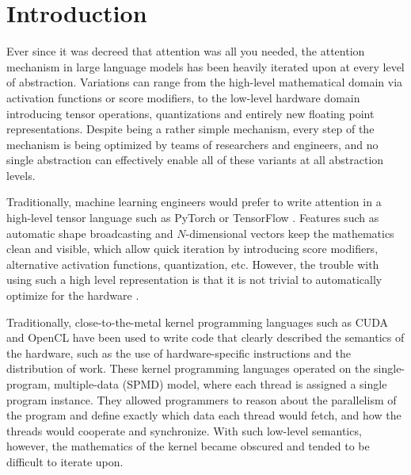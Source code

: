 \documentclass[review, anonymous, acmsmall]{acmart}
\begin{document}

\fi

\maketitle

\section{Introduction}

Ever since it was decreed that attention was all you needed, the attention mechanism in large language models has been heavily iterated upon at every level of abstraction. Variations can range from the high-level mathematical domain via activation functions or score modifiers, to the low-level hardware domain introducing tensor operations, quantizations and entirely new floating point representations. Despite being a rather simple mechanism, every step of the mechanism is being optimized by teams of researchers and engineers, and no single abstraction can effectively enable all of these variants at all abstraction levels.

Traditionally, machine learning engineers would prefer to write attention in a high-level tensor language such as PyTorch or TensorFlow
. Features such as automatic shape broadcasting and $N$-dimensional vectors keep the mathematics clean and visible, which allow quick iteration by introducing score modifiers, alternative activation functions, quantization, etc. However, the trouble with using such a high level representation is that it is not trivial to automatically optimize for the hardware 
.

Traditionally, close-to-the-metal kernel programming languages such as CUDA and OpenCL have been used to write code that clearly described the semantics of the hardware, such as the use of hardware-specific instructions and the distribution of work. These kernel programming languages operated on the single-program, multiple-data (SPMD) model, where each thread is assigned a single program instance. They allowed programmers to reason about the parallelism of the program and define exactly which data each thread would fetch, and how the threads would cooperate and synchronize. With such low-level semantics, however, the mathematics of the kernel became obscured and tended to be difficult to iterate upon.
\end{document}

